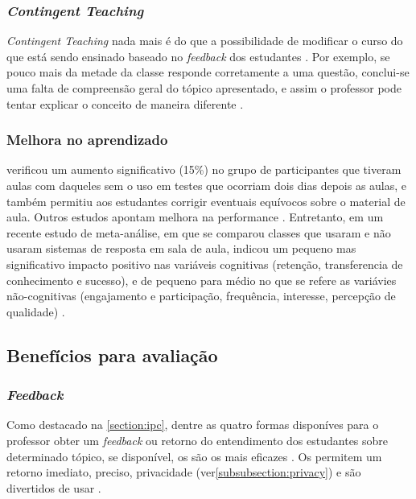 \subsubsection{\textit{Contingent Teaching}}\label{sussubsection:contingent}
\textit{Contingent Teaching} nada mais é do que a possibilidade de modificar
o curso do que está sendo ensinado baseado no \textit{feedback} dos estudantes
\cite{Arnesen2013, Caldwell2007}. Por exemplo, se pouco mais da metade da classe
responde corretamente a uma questão, conclui-se uma falta de compreensão geral do
tópico apresentado, e assim o professor pode tentar explicar o conceito
de maneira diferente \cite{Terrion2012, Strasser2010}.

\subsubsection{Melhora no aprendizado}
 verificou um aumento significativo (15\%) no grupo de
participantes que tiveram aulas com {\clickers} daqueles sem o uso em testes que
ocorriam dois dias depois as aulas, e também permitiu aos estudantes corrigir
eventuais equívocos sobre o material de aula. Outros estudos apontam melhora
na performance \cite{Sun2014, Caldwell2007}. Entretanto, em um recente estudo de meta-análise,
em que se comparou classes que usaram e não usaram sistemas de resposta em sala de aula,
indicou um pequeno mas significativo impacto positivo nas variáveis cognitivas (retenção,
transferencia de conhecimento e sucesso), e de pequeno para médio no que se refere
as variávies não-cognitivas (engajamento e participação, frequência, interesse,
percepção de qualidade) \cite{Hunsu2016}.

\subsection{Benefícios para avaliação}

\subsubsection{\textit{Feedback}}
Como destacado na \autoref{section:ipc}, dentre as quatro formas disponíves para
o professor obter um \textit{feedback} ou retorno do entendimento dos estudantes
sobre determinado tópico, se disponível, os {\clickers} são os mais eficazes \cite{Crouch2007}.
Os {\clickers} permitem um retorno imediato, preciso, privacidade (ver\autoref{subsubsection:privacy}) e
são divertidos de usar \cite{Rana2016, Blood2013, Caldwell2007}.

